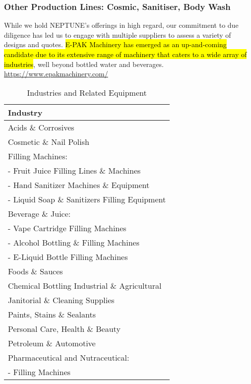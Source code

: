 \documentclass{article}
\begin{document}
\subsubsection{Other Production Lines: Cosmic, Sanitiser, Body Wash}

While we hold NEPTUNE's offerings in high regard, our commitment to due diligence has led us to engage with multiple suppliers to assess a variety of designs and quotes. \hl{E-PAK Machinery has emerged as an up-and-coming candidate due to its extensive range of machinery that caters to a wide array of industries}, well beyond bottled water and beverages. \url{https://www.epakmachinery.com/}\par


\begin{table}[h]
\centering
\caption{Industries and Related Equipment}
\begin{tabularx}{\textwidth}{|X|}
\hline
\textbf{Industry} \\ \hline
Acids \& Corrosives \\ \hline
Cosmetic \& Nail Polish \\ \hline
Filling Machines: \\
- Fruit Juice Filling Lines \& Machines \\
- Hand Sanitizer Machines \& Equipment \\
- Liquid Soap \& Sanitizers Filling Equipment \\ \hline
Beverage \& Juice: \\
- Vape Cartridge Filling Machines \\
- Alcohol Bottling \& Filling Machines \\
- E-Liquid Bottle Filling Machines \\ \hline
Foods \& Sauces \\ \hline
Chemical Bottling Industrial \& Agricultural \\ \hline
Janitorial \& Cleaning Supplies \\ \hline
Paints, Stains \& Sealants \\ \hline
Personal Care, Health \& Beauty \\ \hline
Petroleum \& Automotive \\ \hline
Pharmaceutical and Nutraceutical: \\
- Filling Machines \\
\hline
\end{tabularx}
\end{table}
\end{document}
